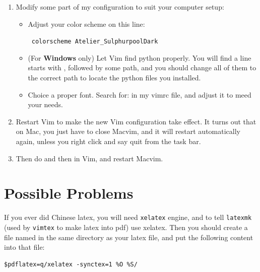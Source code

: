 \documentclass{article}
\newcommand\command[1]{\texttt{\centering #1}}
\begin{document}
\begin{enumerate}
\begin{enumerate}
            \item Modify some part of my configuration to suit your
                computer setup:
                \begin{itemize}
                    \item Adjust your color scheme on this line:

                        \command{ colorscheme~Atelier\_SulphurpoolDark }

                    \item (For \textbf{Windows} only) Let Vim find
                        python properly. You will find a line starts
                        with , followed by
                        some path, and you should change all of them
                        to the correct path to locate the python files
                        you installed.

                    \item Choice a proper font. Search for:  in my vimrc file, and
                        adjust it to meed your needs.
                \end{itemize}

            \item Restart Vim to make the new Vim configuration take
                effect. It turns out that on Mac, you just have to
                close Macvim, and it will restart automatically again,
                unless you right click and say quit from the task bar.

            \item Then do  and then
                 in Vim, and restart Macvim. 

        \end{enumerate}
        
\end{enumerate}

\section{Possible Problems}
\label{sec:Possible Problems}

If you ever did Chinese latex, you will need \texttt{xelatex} engine,
and to tell \texttt{latexmk} (used by \texttt{vimtex} to make latex into
pdf) use xelatex. Then you should create a file named
 in the same directory as your latex file, and put the following content into
that file:
\begin{verbatim}
$pdflatex=q/xelatex -synctex=1 %O %S/
\end{verbatim}
\end{document}
